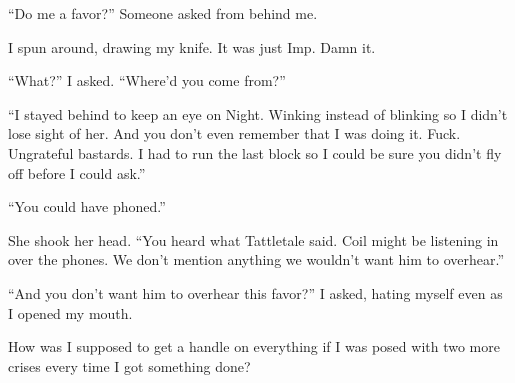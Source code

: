 ``Do me a favor?''  Someone asked from behind me.



I spun around, drawing my knife.  It was just Imp.  Damn it.



``What?'' I asked.  ``Where'd you come from?''



``I stayed behind to keep an eye on Night.  Winking instead of blinking so I didn't lose sight of her.  And you don't even remember that I was doing it.  Fuck.  Ungrateful bastards.  I had to run the last block so I could be sure you didn't fly off before I could ask.''



``You could have phoned.''



She shook her head.  ``You heard what Tattletale said.  Coil might be listening in over the phones.  We don't mention anything we wouldn't want him to overhear.''



``And you don't want him to overhear this favor?'' I asked, hating myself even as I opened my mouth.



How was I supposed to get a handle on everything if I was posed with two more crises every time I got something done?





